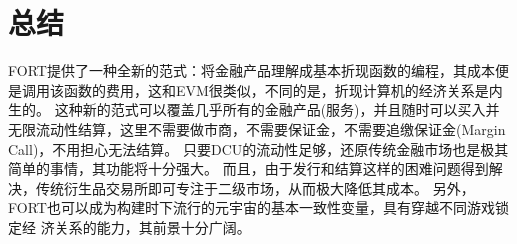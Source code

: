 \documentclass[letterpaper,11pt]{ctexart}
\begin{document}
\section{总结}
FORT提供了一种全新的范式：将金融产品理解成基本折现函数的编程，其成本便是调用该函数的费用，这和EVM很类似，不同的是，折现计算机的经济关系是内生的。
这种新的范式可以覆盖几乎所有的金融产品(服务)，并且随时可以买入并无限流动性结算，这里不需要做市商，不需要保证金，不需要追缴保证金(Margin Call)，不用担心无法结算。
只要DCU的流动性足够，还原传统金融市场也是极其简单的事情，其功能将十分强大。
而且，由于发行和结算这样的困难问题得到解决，传统衍生品交易所即可专注于二级市场，从而极大降低其成本。
另外，FORT也可以成为构建时下流行的元宇宙的基本一致性变量，具有穿越不同游戏锁定经 济关系的能力，其前景十分广阔。



\end{document}
